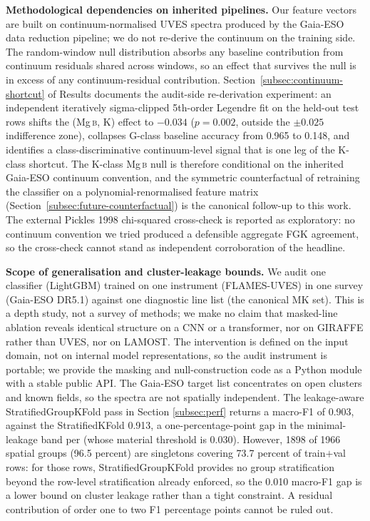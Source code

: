 \documentclass[11pt,a4paper]{article}
\newcommand{\Mgb}{Mg\,\textsc{b}\xspace}
\begin{document}
\textbf{Methodological dependencies on inherited pipelines.} Our feature vectors are built on continuum-normalised UVES spectra produced by the Gaia-ESO data reduction pipeline; we do not re-derive the continuum on the training side. The random-window null distribution absorbs any baseline contribution from continuum residuals shared across windows, so an effect that survives the null is in excess of any continuum-residual contribution. Section~\ref{subsec:continuum-shortcut} of Results documents the audit-side re-derivation experiment: an independent iteratively sigma-clipped 5th-order Legendre fit on the held-out test rows shifts the (\Mgb, K) effect to $-0.034$ ($p = 0.002$, outside the $\pm 0.025$ indifference zone), collapses G-class baseline accuracy from 0.965 to 0.148, and identifies a class-discriminative continuum-level signal that is one leg of the K-class shortcut. The K-class \Mgb null is therefore conditional on the inherited Gaia-ESO continuum convention, and the symmetric counterfactual of retraining the classifier on a polynomial-renormalised feature matrix (Section~\ref{subsec:future-counterfactual}) is the canonical follow-up to this work. The external Pickles 1998 chi-squared cross-check is reported as exploratory: no continuum convention we tried produced a defensible aggregate FGK agreement, so the cross-check cannot stand as independent corroboration of the headline.

\textbf{Scope of generalisation and cluster-leakage bounds.} We audit one classifier (LightGBM) trained on one instrument (FLAMES-UVES) in one survey (Gaia-ESO DR5.1) against one diagnostic line list (the canonical MK set). This is a depth study, not a survey of methods; we make no claim that masked-line ablation reveals identical structure on a CNN or a transformer, nor on GIRAFFE rather than UVES, nor on LAMOST. The intervention is defined on the input domain, not on internal model representations, so the audit instrument is portable; we provide the masking and null-construction code as a Python module with a stable public API. The Gaia-ESO target list concentrates on open clusters and known fields, so the spectra are not spatially independent. The leakage-aware StratifiedGroupKFold pass in Section \ref{subsec:perf} returns a macro-F1 of 0.903, against the StratifiedKFold 0.913, a one-percentage-point gap in the minimal-leakage band per \citet{2019MNRAS.486.2075B} (whose material threshold is 0.030). However, 1898 of 1966 spatial groups (96.5 percent) are singletons covering 73.7 percent of train$+$val rows: for those rows, StratifiedGroupKFold provides no group stratification beyond the row-level stratification already enforced, so the 0.010 macro-F1 gap is a lower bound on cluster leakage rather than a tight constraint. A residual contribution of order one to two F1 percentage points cannot be ruled out.
\end{document}

